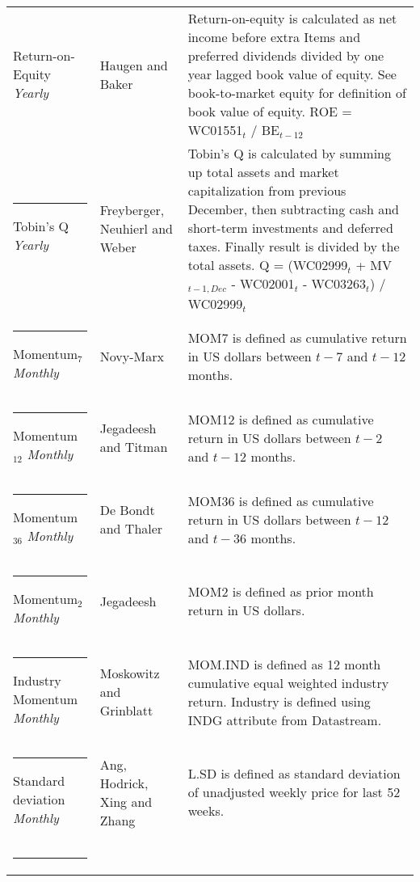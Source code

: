 \documentclass{article}
\begin{document}
{{\begin{xltabular}{\textwidth}{ >{\raggedright\arraybackslash}p{0.23\textwidth} >{\raggedright\arraybackslash}p{0.2\textwidth} X}
Return-on-Equity \newline \emph{Yearly}		& Haugen and Baker \citeyear{HAUGEN1996}		& Return-on-equity is calculated as net income before extra Items and preferred dividends divided by one year lagged book value of equity. See book-to-market equity for definition of book value of equity. \newline ROE = WC01551$_{t}$ / BE$_{t-12}$ \\ \rule{-1ex}{3ex}
Tobin's Q 	\newline \emph{Yearly}			& Freyberger, Neuhierl and Weber \citeyear{Freyberger2020} & Tobin's Q is calculated by summing up total assets and market capitalization from previous December, then subtracting cash and short-term investments and deferred taxes. Finally result is divided by the total assets. \newline Q = (WC02999$_{t}$ + MV$_{t-1, Dec}$ - WC02001$_{t}$ - WC03263$_{t}$) / WC02999$_{t}$ \\ \rule{-1ex}{3ex}
Momentum$_{7}$ \newline \emph{Monthly}	& Novy-Marx \citeyear{NOVYMARX2012}			& MOM7 is defined as cumulative return in US dollars between $t-7$ and $t-12$ months.\\ \rule{-1ex}{3ex}
Momentum$_{12}$ \newline \emph{Monthly}	& Jegadeesh and Titman \citeyear{Jegadeesh1993}	& MOM12 is defined as cumulative return in US dollars between $t-2$ and $t-12$ months.\\ \rule{-1ex}{3ex}
Momentum$_{36}$ \newline \emph{Monthly}	& De Bondt and Thaler \citeyear{DeBondt1985}		& MOM36 is defined as cumulative return in US dollars between $t-12$ and $t-36$ months.\\ \rule{-1ex}{3ex}
Momentum$_{2}$ \newline \emph{Monthly}	& Jegadeesh \citeyear{Jegadeesh1990}			& MOM2 is defined as prior month return in US dollars.\\ \rule{-1ex}{3ex}
Industry Momentum \newline \emph{Monthly} 	& Moskowitz and Grinblatt \citeyear{Moskowitz1999}	& MOM.IND is defined as 12 month cumulative equal weighted industry return. Industry is defined using INDG attribute from Datastream. \\ \rule{-1ex}{3ex}
Standard deviation \newline \emph{Monthly}	& Ang, Hodrick, Xing and Zhang \citeyear{ang2006}	& L.SD is defined as standard deviation of unadjusted weekly price for last 52 weeks. \\ \rule{-1ex}{3ex}

\end{xltabular}}}
\end{document}
